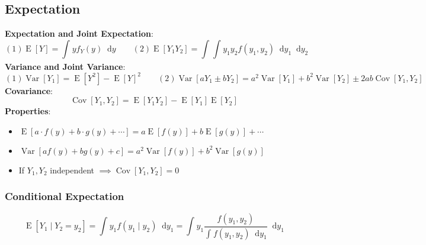 \documentclass[12pt]{article}
\newcommand{\defn}[1]{\textbf{#1}:}
\newcommand{\expt}[1]{\operatorname{E}[#1]}
\newcommand{\var}[1]{\operatorname{Var}\left[#1\right]}
\newcommand{\cov}[1]{\operatorname{Cov}\left[#1\right]}
\newcommand*\diff{\mathop{}\!\mathrm{d}}
\newcommand{\intv}[4]{\int_{#3}^{#4} #1 \diff #2}
\begin{document}
\subsection{Expectation}
\defn{Expectation and Joint Expectation}
\[
    (1) \expt{Y} = \intv{yf_{Y}(y)}{y}{}{} 
    \qquad
    (2) \expt{Y_1Y_2} = \intv{ \intv{ y_1y_2f(y_1, y_2) }{y_1}{}{} }{y_2}{}{}
\]
\defn{Variance and Joint Variance}
\[
    (1) \var{Y_1} = \expt{Y^2} - \expt{Y}^2
    \qquad
    (2) \var{aY_1 \pm bY_2} = a^2\var{Y_1} + b^2\var{Y_2} \pm 2ab\cov{Y_1, Y_2}
\]
\defn{Covariance}
\[
    \cov{Y_1, Y_2} = \expt{Y_1Y_2} - \expt{Y_1}\expt{Y_2}
\]
\defn{Properties} \begin{itemize}
    \item $\expt{a\cdot f(y) + b\cdot g(y) + \cdots} = a\expt{f(y)} + b\expt{g(y)} + \cdots$
    \item $\var{af(y) + bg(y) + c} = a^2\var{f(y)} + b^2\var{g(y)}$
    \item If $Y_1, Y_2$ independent $\implies \cov{Y_1, Y_2} = 0$
\end{itemize}

\subsubsection{Conditional Expectation}
\[
    \expt{Y_1 \mid Y_2 = y_2} 
    = \intv{ y_1f(y_1 \mid y_2) }{y_1}{}{}
    = \intv{y_1 \frac{f(y_1, y_2)}{ \intv{ f(y_1, y_2) }{y_1}{}{} }}{y_1}{}{}
\]
\clearpage
\end{document}
